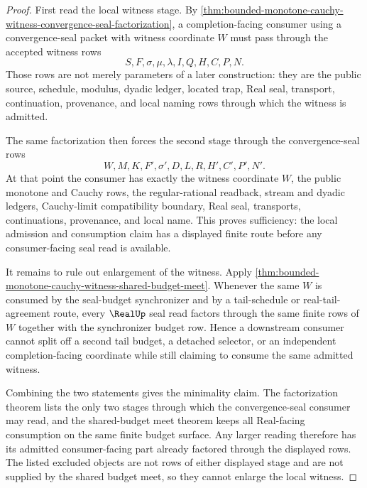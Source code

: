 \begin{proof}
First read the local witness stage. By \autoref{thm:bounded-monotone-cauchy-witness-convergence-seal-factorization}, a completion-facing consumer using a convergence-seal packet with witness coordinate $W$ must pass through the accepted witness rows
$$
S,F,\sigma,\mu,\lambda,I,Q,H,C,P,N.
$$
Those rows are not merely parameters of a later construction: they are the public source, schedule, modulus, dyadic ledger, located trap, Real seal, transport, continuation, provenance, and local naming rows through which the witness is admitted.

The same factorization then forces the second stage through the convergence-seal rows
$$
W,M,K,F',\sigma',D,L,R,H',C',P',N'.
$$
At that point the consumer has exactly the witness coordinate $W$, the public monotone and Cauchy rows, the regular-rational readback, stream and dyadic ledgers, Cauchy-limit compatibility boundary, Real seal, transports, continuations, provenance, and local name. This proves sufficiency: the local admission and consumption claim has a displayed finite route before any consumer-facing seal read is available.

It remains to rule out enlargement of the witness. Apply \autoref{thm:bounded-monotone-cauchy-witness-shared-budget-meet}. Whenever the same $W$ is consumed by the seal-budget synchronizer and by a tail-schedule or real-tail-agreement route, every $\RealUp$ seal read factors through the same finite rows of $W$ together with the synchronizer budget row. Hence a downstream consumer cannot split off a second tail budget, a detached selector, or an independent completion-facing coordinate while still claiming to consume the same admitted witness.

Combining the two statements gives the minimality claim. The factorization theorem lists the only two stages through which the convergence-seal consumer may read, and the shared-budget meet theorem keeps all Real-facing consumption on the same finite budget surface. Any larger reading therefore has its admitted consumer-facing part already factored through the displayed rows. The listed excluded objects are not rows of either displayed stage and are not supplied by the shared budget meet, so they cannot enlarge the local witness.
\end{proof}
